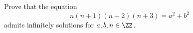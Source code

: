 Prove that the equation 
\[
	n (n+1) (n+2) (n+3) = a^2 + b^2
\]
admits infinitely solutions for $a, b, n \in \ZZ$.
